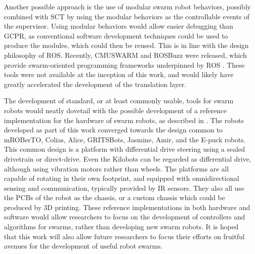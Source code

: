 Another possible approach is the use of modular swarm robot behaviors, possibly combined with SCT by using the modular behaviors as the controllable events of the supervisor. 
Using modular behaviors would allow easier debugging than GCPR, as conventional software development techniques could be used to produce the modules, which could then be reused. 
This is in line with the design philosophy of ROS. 
Recently, CMUSWARM and ROSBuzz were released, which provide swarm-oriented programming frameworks underpinned by ROS \citep{arpino2018using, DBLP:journals/corr/abs-1710-08843}.
These tools were not available at the inception of this work, and would likely have greatly accelerated the development of the translation layer. 

The development of standard, or at least commonly usable, tools for swarm robots would neatly dovetail with the possible development of a reference implementation for the hardware of swarm robots, as described in \citep{francesca2014experiment}.
The robots developed as part of this work converged towards the design common to mROBerTO, Colias, Alice, GRITSBots, Jasmine, Amir, and the E-puck robots. 
This common design is a platform with differential drive steering using a sealed drivetrain or direct-drive. 
Even the Kilobots can be regarded as differential drive, although using vibration motors rather than wheels.
The platforms are all capable of rotating in their own footprint, and equipped with omnidirectional sensing and communication, typically provided by IR sensors.
They also all use the PCBs of the robot as the chassis, or a custom chassis which could be produced by 3D printing.  
These reference implementations in both hardware and software would allow researchers to focus on the development of controllers and algorithms for swarms, rather than developing new swarm robots.
It is hoped that this work will also allow future researchers to focus their efforts on fruitful avenues for the development of useful robot swarms.   

%
%	

